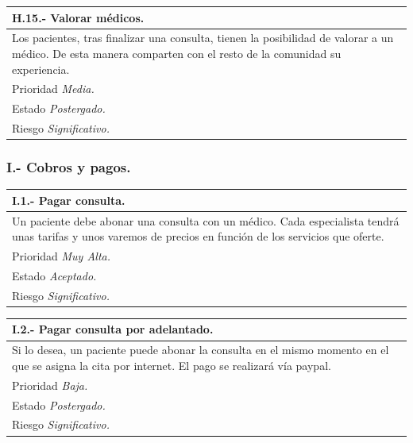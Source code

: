 \documentclass[a4paper,oneside,11pt]{book}
\begin{document}
\begin{center}
\begin{tabulary}{15cm}{|L|}
	\hline
		\bf{H.15.- Valorar médicos.} \\
	\hline
		Los pacientes, tras finalizar una consulta, tienen la posibilidad de valorar a un médico. De esta manera comparten con el resto de la comunidad su experiencia. \\
	\hline
		Prioridad \textit{Media.} \\
	\hline
		Estado \textit{Postergado.} \\
	\hline
		Riesgo \textit{Significativo.} \\
	\hline
\end{tabulary}
\end{center}


\subsubsection{I.- Cobros y pagos.}

\begin{center}
\begin{tabulary}{15cm}{|L|}
	\hline
		\bf{I.1.- Pagar consulta.} \\
	\hline
		Un paciente debe abonar una consulta con un médico. Cada especialista tendrá unas tarifas y unos varemos de precios en función de los servicios que oferte.  \\
	\hline
		Prioridad \textit{Muy Alta.} \\
	\hline
		Estado \textit{Aceptado.} \\
	\hline
		Riesgo \textit{Significativo.} \\
	\hline
\end{tabulary}
\end{center}

\begin{center}
\begin{tabulary}{15cm}{|L|}
	\hline
		\bf{I.2.- Pagar consulta por adelantado.} \\
	\hline
		Si lo desea, un paciente puede abonar la consulta en el mismo momento en el que se asigna la cita por internet. El pago se realizará vía paypal. \\
	\hline
		Prioridad \textit{Baja.} \\
	\hline
		Estado \textit{Postergado.} \\
	\hline
		Riesgo \textit{Significativo.} \\
	\hline
\end{tabulary}
\end{center}
\end{document}

